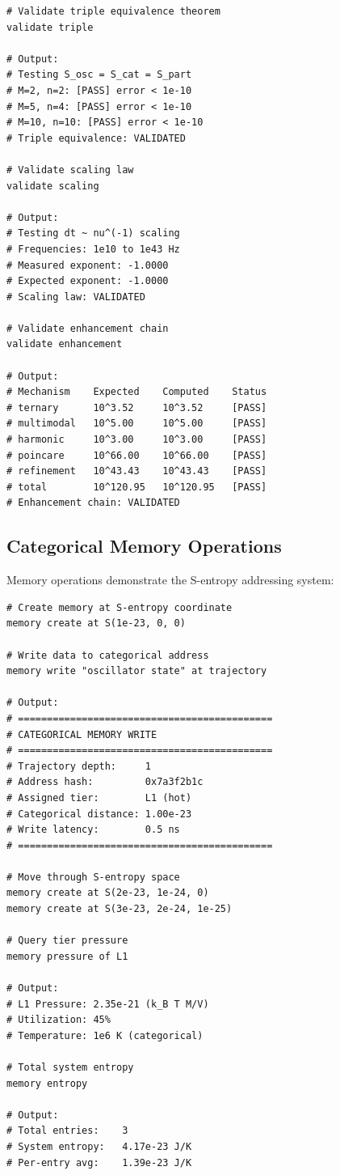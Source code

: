 \documentclass[twocolumn,10pt]{article}
\begin{document}
\begin{lstlisting}[caption={Validation commands}]
# Validate triple equivalence theorem
validate triple

# Output:
# Testing S_osc = S_cat = S_part
# M=2, n=2: [PASS] error < 1e-10
# M=5, n=4: [PASS] error < 1e-10
# M=10, n=10: [PASS] error < 1e-10
# Triple equivalence: VALIDATED

# Validate scaling law
validate scaling

# Output:
# Testing dt ~ nu^(-1) scaling
# Frequencies: 1e10 to 1e43 Hz
# Measured exponent: -1.0000
# Expected exponent: -1.0000
# Scaling law: VALIDATED

# Validate enhancement chain
validate enhancement

# Output:
# Mechanism    Expected    Computed    Status
# ternary      10^3.52     10^3.52     [PASS]
# multimodal   10^5.00     10^5.00     [PASS]
# harmonic     10^3.00     10^3.00     [PASS]
# poincare     10^66.00    10^66.00    [PASS]
# refinement   10^43.43    10^43.43    [PASS]
# total        10^120.95   10^120.95   [PASS]
# Enhancement chain: VALIDATED
\end{lstlisting}

\subsection{Categorical Memory Operations}

Memory operations demonstrate the S-entropy addressing system:

\begin{lstlisting}[caption={Categorical memory management}]
# Create memory at S-entropy coordinate
memory create at S(1e-23, 0, 0)

# Write data to categorical address
memory write "oscillator state" at trajectory

# Output:
# ============================================
# CATEGORICAL MEMORY WRITE
# ============================================
# Trajectory depth:     1
# Address hash:         0x7a3f2b1c
# Assigned tier:        L1 (hot)
# Categorical distance: 1.00e-23
# Write latency:        0.5 ns
# ============================================

# Move through S-entropy space
memory create at S(2e-23, 1e-24, 0)
memory create at S(3e-23, 2e-24, 1e-25)

# Query tier pressure
memory pressure of L1

# Output:
# L1 Pressure: 2.35e-21 (k_B T M/V)
# Utilization: 45%
# Temperature: 1e6 K (categorical)

# Total system entropy
memory entropy

# Output:
# Total entries:    3
# System entropy:   4.17e-23 J/K
# Per-entry avg:    1.39e-23 J/K
\end{lstlisting}
\end{document}
